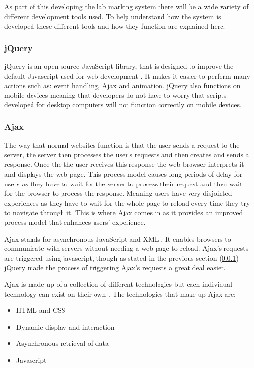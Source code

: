 \documentclass[12pt]{article}  %
\begin{document}
As part of this developing the lab marking system there will be a wide variety of different development tools used. To help understand how the system is developed these different tools and how they function are explained here.  



\subsubsection{jQuery} \label{sec:jquery}
jQuery is an open source JavaScript library, that is designed to improve the default Javascript used for web development \cite{jquery.org_jquery_nodate}. It makes it easier to perform many actions such as: event handling, Ajax and animation. jQuery also functions on mobile devices meaning that developers do not have to worry that scripts developed for desktop computers will not function correctly on mobile devices.  

\subsubsection{Ajax}
The way that normal websites function is that the user sends a request to the server, the server then processes the user's requests and then creates and sends a response. Once the the user receives this response the web browser interprets it and displays the web page\cite{smith_simplifying_2006}. This process model causes long periods of delay for users as they have to wait for the server to process their request and then wait for the browser to process the response. Meaning users have very disjointed experiences as they have to wait for the whole page to reload every time they try to navigate through it. This is where Ajax comes in as it provides an improved process model that enhances users' experience.  

 Ajax stands for asynchronous JavaScript and XML \cite{jquery.org_ajax_nodate}. It enables browsers to communicate with servers without needing a web page to reload. Ajax's requests are triggered using javascript, though as stated in the previous section (\ref{sec:jquery}) jQuery made the process of triggering Ajax's requests a great deal easier.  
 
 Ajax is made up of a collection of different technologies but each individual technology can exist on their own \cite{garrett_ajax:_2005}. The technologies that make up Ajax are:
 
 \begin{itemize}
 \item HTML and CSS
 \item Dynamic display and interaction
 \item Asynchronous retrieval of data
 \item Javascript
 \end{itemize}
\end{document}
